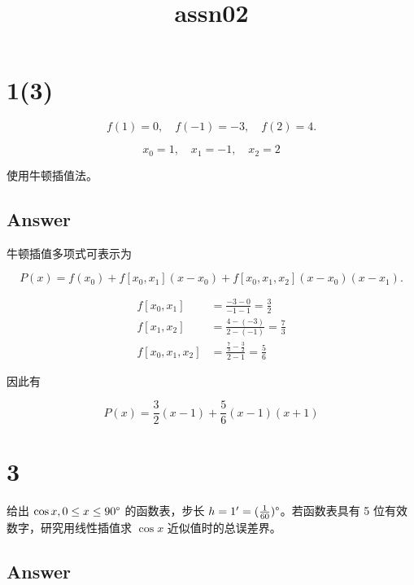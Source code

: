 \documentclass[11pt]{article}
\title{assn02}
\begin{document}
    
    \maketitle
    
    

    
    \section{1(3)}\label{section}

\[
f(1)=0,\quad f(-1)=-3,\quad f(2)=4.
\]

\[
x_0=1,\quad x_1=-1,\quad x_2=2
\]

使用牛顿插值法。

\subsection{Answer}\label{answer}

牛顿插值多项式可表示为

\[
P(x) = f(x_0) + f[x_0,x_1](x-x_0) + f[x_0,x_1,x_2](x-x_0)(x-x_1).
\]

\[
\begin{aligned}
f[x_0,x_1] &= \frac{-3-0}{-1-1} = \frac{3}{2} \\
f[x_1,x_2] &= \frac{4-(-3)}{2-(-1)} = \frac{7}{3} \\
f[x_0,x_1,x_2] &= \frac{\frac{7}{3}-\frac{3}{2}}{2-1} = \frac{5}{6}
\end{aligned}
\]

因此有

\[
\boxed{
P(x) = \frac{3}{2}(x-1) + \frac{5}{6}(x-1)(x+1)
}
\]

    \section{3}\label{section}

给出 \(\cos x, 0\le x\le 90\degree\) 的函数表，步长
\(h = 1' = (\frac{1}{60})\degree\)。若函数表具有 5
位有效数字，研究用线性插值求 \(\cos x\) 近似值时的总误差界。

\subsection{Answer}\label{answer}
\end{document}
